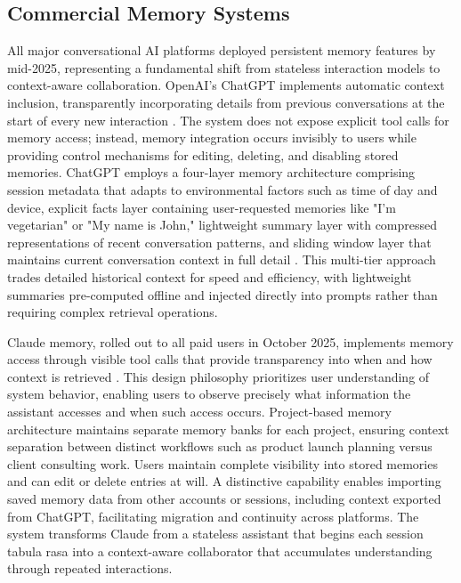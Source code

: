 \documentclass[11pt,letterpaper]{article}
\begin{document}
\subsection{Commercial Memory Systems}

All major conversational AI platforms deployed persistent memory features by mid-2025, representing a fundamental shift from stateless interaction models to context-aware collaboration. OpenAI's ChatGPT implements automatic context inclusion, transparently incorporating details from previous conversations at the start of every new interaction \cite{openai2024memory}. The system does not expose explicit tool calls for memory access; instead, memory integration occurs invisibly to users while providing control mechanisms for editing, deleting, and disabling stored memories. ChatGPT employs a four-layer memory architecture comprising session metadata that adapts to environmental factors such as time of day and device, explicit facts layer containing user-requested memories like "I'm vegetarian" or "My name is John," lightweight summary layer with compressed representations of recent conversation patterns, and sliding window layer that maintains current conversation context in full detail \cite{greyling2024chatgpt}. This multi-tier approach trades detailed historical context for speed and efficiency, with lightweight summaries pre-computed offline and injected directly into prompts rather than requiring complex retrieval operations.

Claude memory, rolled out to all paid users in October 2025, implements memory access through visible tool calls that provide transparency into when and how context is retrieved \cite{anthropic2025memory}. This design philosophy prioritizes user understanding of system behavior, enabling users to observe precisely what information the assistant accesses and when such access occurs. Project-based memory architecture maintains separate memory banks for each project, ensuring context separation between distinct workflows such as product launch planning versus client consulting work. Users maintain complete visibility into stored memories and can edit or delete entries at will. A distinctive capability enables importing saved memory data from other accounts or sessions, including context exported from ChatGPT, facilitating migration and continuity across platforms. The system transforms Claude from a stateless assistant that begins each session tabula rasa into a context-aware collaborator that accumulates understanding through repeated interactions.
\end{document}
